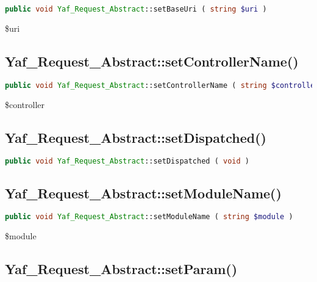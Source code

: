 \begin{lstlisting}[language=PHP]
public void Yaf_Request_Abstract::setBaseUri ( string $uri )
\end{lstlisting}

\begin{compactitem}
\item \$uri
\end{compactitem}

\subsection{Yaf\_Request\_Abstract::setControllerName()}

\begin{lstlisting}[language=PHP]
public void Yaf_Request_Abstract::setControllerName ( string $controller )
\end{lstlisting}

\begin{compactitem}
\item \$controller
\end{compactitem}

\subsection{Yaf\_Request\_Abstract::setDispatched()}

\begin{lstlisting}[language=PHP]
public void Yaf_Request_Abstract::setDispatched ( void )
\end{lstlisting}


\subsection{Yaf\_Request\_Abstract::setModuleName()}


\begin{lstlisting}[language=PHP]
public void Yaf_Request_Abstract::setModuleName ( string $module )
\end{lstlisting}

\begin{compactitem}
\item \$module
\end{compactitem}



\subsection{Yaf\_Request\_Abstract::setParam()}

